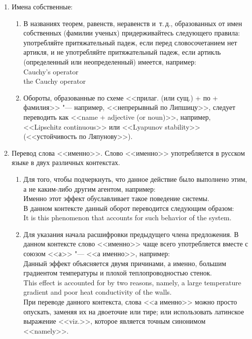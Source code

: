 \documentclass[a5paper, 10pt, twoside, numbers=enddot]{scrartcl}
\newcommand{\etc}{и~т.\,д.\xspace}
\begin{document}
\begin{enumerate}
  \item Имена собственные:
    \begin{enumerate}
      \item В названиях теорем, равенств, неравенств \etc, образованных от имен собственных (фамилии
        ученых) придерживайтесь следующего правила: употребляйте притяжательный падеж, если перед
        словосочетанием нет артикля, и не употребляйте притяжательный падеж, если артикль
        (определенный или неопределенный) имеется, например:\\ [4pt]
        \textsf{
          Cauchy's operator\\
          the Cauchy operator
        }

      \item Обороты, образованные по схеме <<прилаг. (или сущ.) + по + фамилия>> "--- например,
        <<непрерывный по Липшицу>>, следует переводить как <<name + adjective (or noun)>>,
        например, <<Lipschitz continuous>> или <<Lyapunov stability>> (<<устойчивость по
        Ляпунову>>).
    \end{enumerate}

  \item Перевод слова <<именно>>. Слово <<именно>> употребляется в русском языке в двух различных
    контекстах.
    \begin{enumerate}
      \item Для того, чтобы подчеркнуть, что данное действие было выполнено этим, а не каким-либо
        другим агентом, например:\\ [4pt]
        \textsf{Именно этот эффект обуславливает такое поведение системы.}\\ [4pt]
        В данном контексте данный оборот переводится следующим образом:\\ [4pt]
        \textsf{It is this phenomenon that accounts for such behavior of the system.}

      \item Для указания начала расшифровки предыдущего члена предложения. В данном контексте слово
        <<именно>> чаще всего употребляется вместе с союзом <<а>> "--- <<а именно>>, например:\\ [4pt]
        \textsf{
          Данный эффект объясняется двумя причинами, а именно, большим градиентом температуры и
          плохой теплопроводностью стенок.\\
          This effect is accounted for by two reasons, namely, a large temperature gradient and poor
          heat conductivity of the walls.\\ [4pt]
        }
        При переводе данного контекста, слова <<а именно>> можно просто опускать, заменяя их на
        двоеточие или тире; или использовать латинское выражение <<viz.>>, которое является точным
        синонимом <<namely>>.
    \end{enumerate}


\end{enumerate}
\end{document}
